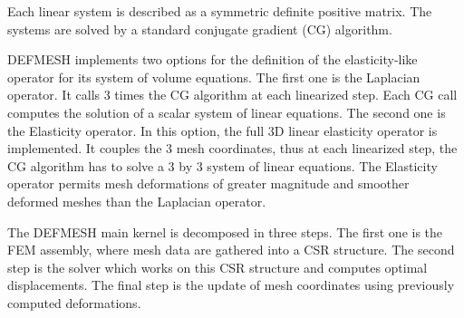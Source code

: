 \documentclass{IOS-Book-Article}
\begin{document}
 Each linear system is described as a symmetric definite positive matrix. The systems are solved by a standard conjugate gradient (CG) algorithm.

DEFMESH implements two options for the definition of the elasticity-like operator for its system of volume equations.
The first one is  the Laplacian operator. It calls 3 times the CG algorithm at each linearized step.  Each CG call computes the solution of a scalar system of linear equations.
The second one is the Elasticity operator. In this option, the full 3D linear elasticity operator is implemented.
It couples the 3 mesh coordinates, thus at each linearized step, the CG algorithm has to solve a 3 by 3 system of linear equations.
The Elasticity operator permits mesh deformations of greater magnitude and smoother deformed meshes than the Laplacian operator.

The DEFMESH main kernel is decomposed in three steps.
The first one is the FEM assembly, where mesh data are gathered into a CSR structure.
The second step is the solver which works on this CSR structure and computes optimal displacements.
The final step is the update of mesh coordinates using previously computed deformations.
\end{document}
